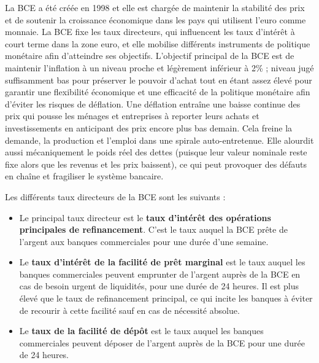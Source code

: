 La BCE a été créée en 1998 et elle est chargée de maintenir la stabilité des prix et de soutenir la croissance économique dans les pays qui utilisent l'euro comme monnaie. La BCE fixe les taux directeurs, qui influencent les taux d'intérêt à court terme dans la zone euro, et elle mobilise différents instruments de politique monétaire afin d'atteindre ses objectifs. \newline
L'objectif principal de la BCE est de maintenir l'inflation à un niveau proche et légèrement inférieur à 2\% ; niveau jugé suffisamment bas pour préserver le pouvoir d'achat tout en étant assez élevé pour garantir une flexibilité économique et une efficacité de la politique monétaire afin d'éviter les risques de déflation. Une déflation entraîne une baisse continue des prix qui pousse les ménages et entreprises à reporter leurs achats et investissements en anticipant des prix encore plus bas demain. Cela freine la demande, la production et l'emploi dans une spirale auto-entretenue. Elle alourdit aussi mécaniquement le poids réel des dettes (puisque leur valeur nominale reste fixe alors que les revenus et les prix baissent), ce qui peut provoquer des défauts en chaîne et fragiliser le système bancaire.

Les différents taux directeurs de la BCE sont les suivants \cite{banque_de_france_taux_directeurs} :

\begin{itemize}
    \item Le principal taux directeur est le \textbf{taux d'intérêt des opérations principales de refinancement}. C'est le taux auquel la BCE prête de l'argent aux banques commerciales pour une durée d'une semaine. 
    \item Le \textbf{taux d'intérêt de la facilité de prêt marginal} est le taux auquel les banques commerciales peuvent emprunter de l'argent auprès de la BCE en cas de besoin urgent de liquidités, pour une durée de 24 heures. Il est plus élevé que le taux de refinancement principal, ce qui incite les banques à éviter de recourir à cette facilité sauf en cas de nécessité absolue.
    \item Le \textbf{taux de la facilité de dépôt} est le taux auquel les banques commerciales peuvent déposer de l'argent auprès de la BCE pour une durée de 24 heures. 
\end{itemize}

